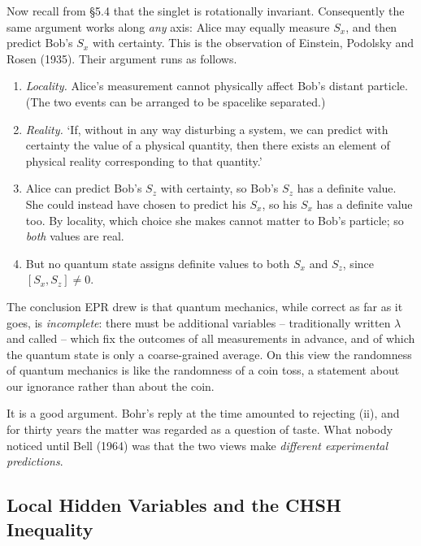\documentclass[a4paper]{scrartcl}
\begin{document}
Now recall from \S5.4 that the singlet is rotationally invariant. Consequently the same argument works along \emph{any} axis: Alice may equally measure $S_x$, and then predict Bob's $S_x$ with certainty. This is the observation of Einstein, Podolsky and Rosen (1935). Their argument runs as follows.

\begin{enumerate}[label=(\roman*)]
    \item \emph{Locality.} Alice's measurement cannot physically affect Bob's distant particle. (The two events can be arranged to be spacelike separated.)
    \item \emph{Reality.} `If, without in any way disturbing a system, we can predict with certainty the value of a physical quantity, then there exists an element of physical reality corresponding to that quantity.'
    \item Alice can predict Bob's $S_z$ with certainty, so Bob's $S_z$ has a definite value. She could instead have chosen to predict his $S_x$, so his $S_x$ has a definite value too. By locality, which choice she makes cannot matter to Bob's particle; so \emph{both} values are real.
    \item But no quantum state assigns definite values to both $S_x$ and $S_z$, since $[S_x, S_z]\neq0$.
\end{enumerate}

The conclusion EPR drew is that quantum mechanics, while correct as far as it goes, is \emph{incomplete}: there must be additional variables -- traditionally written $\lambda$ and called  -- which fix the outcomes of all measurements in advance, and of which the quantum state is only a coarse-grained average. On this view the randomness of quantum mechanics is like the randomness of a coin toss, a statement about our ignorance rather than about the coin.

It is a good argument. Bohr's reply at the time amounted to rejecting (ii), and for thirty years the matter was regarded as a question of taste. What nobody noticed until Bell (1964) was that the two views make \emph{different experimental predictions}.

\subsection{Local Hidden Variables and the CHSH Inequality}
\end{document}
